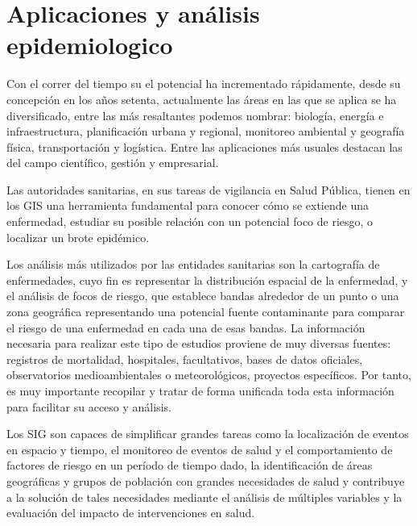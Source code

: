 \section{Aplicaciones y análisis epidemiologico}
\label{sec:cap2-aplicaciones-analisis-epidemiologico}

Con el correr del tiempo su el potencial ha incrementado rápidamente, desde su concepción en los años setenta,
actualmente las áreas en las que se aplica se ha diversificado, entre las más resaltantes podemos nombrar:
biología, energía e infraestructura, planificación urbana y regional, monitoreo ambiental y geografía física,
transportación y logística. Entre las aplicaciones más usuales destacan las del campo científico, gestión 
y empresarial. 

Las autoridades sanitarias, en sus tareas de vigilancia en Salud Pública, tienen en los GIS una 
herramienta fundamental para conocer cómo se extiende una enfermedad, estudiar su posible relación 
con un potencial foco de riesgo, o localizar un brote epidémico\cite{vgomesAegis2001}. 

Los análisis más utilizados por las entidades sanitarias son la cartografía de enfermedades, cuyo fin es
representar la distribución espacial de la enfermedad,  y el análisis de focos de riesgo, que establece 
bandas alrededor de un punto o una zona geográfica representando una potencial fuente contaminante para 
comparar el riesgo de una enfermedad en cada una de esas bandas. La información necesaria para realizar 
este tipo de estudios proviene de muy diversas fuentes: registros de mortalidad, hospitales, facultativos, 
bases de datos oficiales, observatorios medioambientales o meteorológicos, proyectos específicos. Por 
tanto, es muy importante recopilar y tratar de forma unificada toda esta información para facilitar su 
acceso y análisis.

Los SIG son capaces de simplificar grandes tareas como la localización de eventos en espacio y tiempo, 
el monitoreo de eventos de salud y el comportamiento de factores de riesgo en un período de tiempo dado, la
identificación de áreas geográficas y grupos de población con grandes necesidades de salud y contribuye a la
solución de tales necesidades mediante el análisis de múltiples variables y la evaluación del impacto de
intervenciones en salud\cite{iMolinaSigEpidemiologia}.
